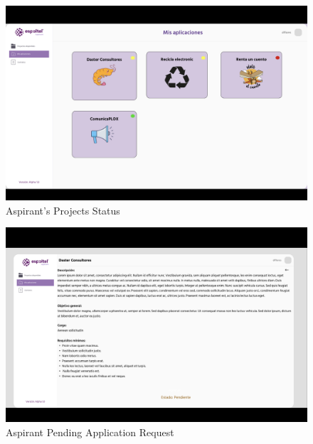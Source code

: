 \documentclass{scrreprt}
\begin{document}
\begin{figure}[H] 
    
    \centering \small
    \includegraphics[width=1\textwidth]{WebPrototype/Projectsflow5.png}
    \caption{Aspirant's Projects Status}
\end{figure} 

\begin{figure}[H]
    
    \centering \small
    \includegraphics[width=1\textwidth]{WebPrototype/Projectflow55.png}
    \caption{Aspirant Pending Application Request  }
\end{figure} 
\end{document}
